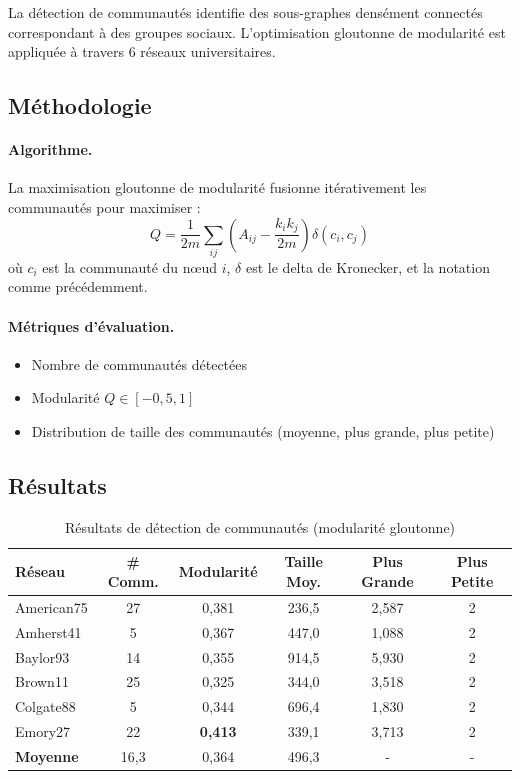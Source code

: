 \documentclass[12pt,a4paper]{article}
\begin{document}
La détection de communautés identifie des sous-graphes densément connectés correspondant à des groupes sociaux. L'optimisation gloutonne de modularité est appliquée à travers 6 réseaux universitaires.

\subsection{Méthodologie}

\paragraph{Algorithme.} La maximisation gloutonne de modularité fusionne itérativement les communautés pour maximiser :
\begin{equation}
Q = \frac{1}{2m} \sum_{ij} \left( A_{ij} - \frac{k_i k_j}{2m} \right) \delta(c_i, c_j)
\end{equation}
où $c_i$ est la communauté du nœud $i$, $\delta$ est le delta de Kronecker, et la notation comme précédemment.

\paragraph{Métriques d'évaluation.}
\begin{itemize}
    \item Nombre de communautés détectées
    \item Modularité $Q \in [-0,5, 1]$
    \item Distribution de taille des communautés (moyenne, plus grande, plus petite)
\end{itemize}

\subsection{Résultats}

\begin{table}[H]
\centering
\caption{Résultats de détection de communautés (modularité gloutonne)}
\label{tab:q6_results}
\begin{tabular}{@{}lccccc@{}}
\toprule
\textbf{Réseau} & \textbf{\# Comm.} & \textbf{Modularité} & \textbf{Taille Moy.} & \textbf{Plus Grande} & \textbf{Plus Petite} \\
\midrule
American75 & 27 & 0,381 & 236,5 & 2,587 & 2 \\
Amherst41 & 5 & 0,367 & 447,0 & 1,088 & 2 \\
Baylor93 & 14 & 0,355 & 914,5 & 5,930 & 2 \\
Brown11 & 25 & 0,325 & 344,0 & 3,518 & 2 \\
Colgate88 & 5 & 0,344 & 696,4 & 1,830 & 2 \\
Emory27 & 22 & \textbf{0,413} & 339,1 & 3,713 & 2 \\
\midrule
\textbf{Moyenne} & 16,3 & 0,364 & 496,3 & - & - \\
\bottomrule
\end{tabular}
\end{table}
\end{document}
